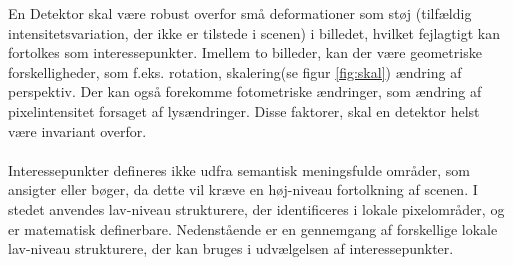 En Detektor skal være robust overfor små deformationer som støj (tilfældig intensitetsvariation, der ikke er tilstede i scenen) i billedet, hvilket fejlagtigt kan fortolkes som interessepunkter. Imellem to billeder, kan der være geometriske forskelligheder, som f.eks. rotation, skalering(se figur  \ref{fig:skal}) ændring af perspektiv. Der kan også forekomme fotometriske ændringer, som ændring af pixelintensitet forsaget af lysændringer. Disse faktorer, skal en detektor helst være invariant overfor.  
\\
\\
Interessepunkter defineres ikke udfra semantisk meningsfulde områder, som ansigter eller bøger, da dette vil kræve en høj-niveau fortolkning af scenen. I stedet anvendes lav-niveau strukturere, der identificeres i lokale pixelområder, og er matematisk definerbare. Nedenstående er en gennemgang af forskellige lokale lav-niveau strukturere, der kan bruges i udvælgelsen af interessepunkter.
\newpage


